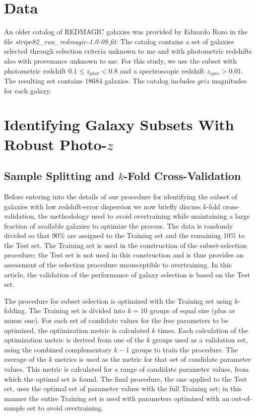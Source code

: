 \documentclass[preprint]{aastex}
\begin{document}
\section{Data}
An older catalog of REDMAGIC galaxies was provided by Eduardo Rozo in the file {\it stripe82\_\-run\_\-redmagic-1.0-08.fit}.
The catalog contains a set of galaxies selected through selection criteria unknown to me and with photometric redshifts
also with provenance unknown to me.  For this study, we use the subset with photometric redshift $0.1\le z_{phot} < 0.8$
and a spectroscopic redshift $z_{spec}>0.01$.   The resulting set contains 18684 galaxies. 
The catalog includes $griz$ magnitudes for each galaxy.

\section{Identifying Galaxy Subsets With Robust Photo-$z$}
\subsection{Sample Splitting and $k$-Fold Cross-Validation}
Before entering into the details of our procedure for identifying the subset of galaxies with low redshift-error dispersion
we now briefly discuss $k$-fold cross-validation, the methodology used to avoid overtraining while maintaining a large fraction
of available galaxies to optimize the process.  The data is randomly divided so that 90\% are assigned to
the Training set and the remaining 10\% to the Test set.  The Training set is used in the construction of the
subset-selection procedure; the Test set is not used in this construction and is thus provides an assessment of the
selection procedure unsusceptible to overtraining.  In this article, the validation of the performance of galaxy selection
is based on the Test set.

The procedure for subset selection is optimized with the Training set using $k$-folding.  The Training set is divided
into $k=10$ groups of equal size (plus or minus one).  For each set of candidate values for the
free  parameters to be optimized, the optimization metric is calculated $k$ times.  Each calculation of the optimization metric
is derived from one of the $k$ groups used as a validation set, using the combined complementary $k-1$ groups to train
the procedure.  The average of the $k$ 
metrics is used as the metric for that set of candidate parameter values.  This metric is calculated for a range of candidate
parameter values, from which the optimal set is found.  The final procedure, the one applied to the Test set, uses
the optimal set of parameter values with the full Training set; in this manner the entire Training set is used with parameters
optimized with an out-of-sample set to avoid overtraining.
\end{document}
